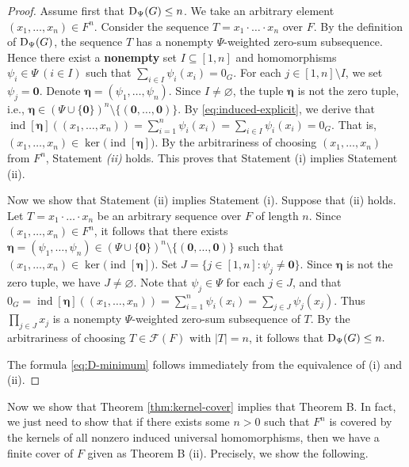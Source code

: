 \documentclass[a4paper, 12pt]{article}
\begin{document}
\begin{proof}
Assume first that ${\rm D}_{\Psi}(G)\le n$. We take an arbitrary element
$(x_1,\ldots,x_n)\in F^n.$
Consider the sequence
$T=x_1\cdot\ldots\cdot x_n$
over $F$. By the definition of ${\rm D}_{\Psi}(G)$, the sequence $T$
has a nonempty $\Psi$-weighted zero-sum subsequence. Hence there exist
a {\bf nonempty} set $I\subseteq[1,n]$ and homomorphisms
$\psi_i\in\Psi \ (i\in I)$
such that
$\sum_{i\in I}\psi_i(x_i)=0_G.$ For each $j\in[1,n]\setminus I$, we set $\psi_j=\mathbf 0$. Denote
$\boldsymbol{\eta}=(\psi_1,\ldots,\psi_n).$
Since $I\neq\varnothing$, the tuple $\boldsymbol{\eta}$ is not the
zero tuple, i.e., $\boldsymbol{\eta}\in
   (\Psi\cup\{\mathbf 0\})^n\setminus
   \{(\mathbf 0,\ldots,\mathbf 0)\}$. By \eqref{eq:induced-explicit}, we derive that
$\operatorname{ind}[\boldsymbol{\eta}]\left((x_1,\ldots,x_n)\right)=\sum_{i=1}^n\psi_i(x_i)=\sum_{i\in I}\psi_i(x_i)=0_G.$ That is,
$(x_1,\ldots,x_n)\in
  \ker\bigl(\operatorname{ind}[\boldsymbol{\eta}]\bigr).$
By the arbitrariness of choosing $(x_1,\ldots,x_n)$ from $F^n$, Statement \emph{(ii)} holds. This proves that Statement (i) implies Statement (ii).

Now we show that Statement (ii) implies Statement (i). Suppose that (ii) holds.  Let
$T=x_1\cdot\ldots\cdot x_n$
be an arbitrary sequence over $F$ of length $n$.  Since $(x_1,\ldots,x_n)\in F^n$, it follows that there
exists
$\boldsymbol{\eta}=(\psi_1,\ldots,\psi_n)
  \in
  (\Psi\cup\{\mathbf 0\})^n
  \setminus\{(\mathbf 0,\ldots,\mathbf 0)\}$
such that
$(x_1,\ldots,x_n)
  \in
  \ker\bigl(\operatorname{ind}[\boldsymbol{\eta}]\bigr).$
Set
$J=\{j\in[1,n]:\psi_j\neq\mathbf 0\}.$
Since $\boldsymbol{\eta}$ is not the zero tuple, we have $J\neq
\varnothing$. Note that $\psi_j\in\Psi$ for each $j\in J$, and that
$0_G=\operatorname{ind}[\boldsymbol{\eta}]
      \left((x_1,\ldots,x_n)\right)=
      \sum_{i=1}^n\psi_i(x_i) =
      \sum_{j\in J}\psi_j(x_j).$
Thus
$\prod\limits_{j\in J}x_j$
is a nonempty $\Psi$-weighted zero-sum subsequence of $T$. By the arbitrariness of choosing $T\in \mathcal{F}(F)$ with $|T|=n$, it follows that
${\rm D}_{\Psi}(G)\le n.$

The formula \eqref{eq:D-minimum} follows immediately from the
equivalence of (i) and (ii).
\end{proof}




Now we show that Theorem \ref{thm:kernel-cover} implies that Theorem B.
In fact, we just need to show  that if there exists some $n>0$ such that $F^n$ is covered by the kernels of all nonzero induced universal homomorphisms, then we have a finite cover of $F$ given as Theorem B (ii). Precisely, we show the following.
\end{document}

